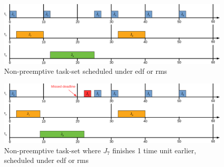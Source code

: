\documentclass{kththesis}
\begin{document}
\begin{figure}

    \centering

    \includegraphics[width=1.0\linewidth]{images/np-test_schedule.pdf}

    \caption{Non-preemptive task-set scheduled under \acrshort{edf} or \acrshort{rms}}

    \label{fig:np-test_schedule}

\end{figure}


\begin{figure}

    \centering

    \includegraphics[width=1.0\linewidth]{images/np-test_schedule_fail.pdf}

    \caption{Non-preemptive task-set where $J_7$ finishes 1 time unit earlier, scheduled under
    \acrshort{edf} or \acrshort{rms}}

    \label{fig:np-test_schedule_fail}

\end{figure}
\end{document}
